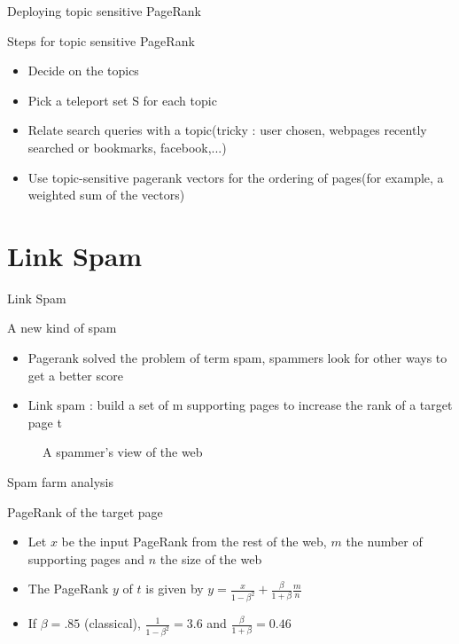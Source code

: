 \documentclass[10pt]{beamer}
\begin{document}
\begin{frame}{Deploying topic sensitive PageRank}
  \begin{block}{Steps for topic sensitive PageRank}
    \begin{itemize}
      \item Decide on the topics
      \item Pick a teleport set S for each topic
      \item Relate search queries with a topic(tricky : user chosen, webpages recently searched or bookmarks, facebook,...)
      \item Use topic-sensitive pagerank vectors for the ordering of pages(for example, a weighted sum of the vectors)
    \end{itemize}
  \end{block}
\end{frame}


\section{Link Spam}
\begin{frame}{Link Spam}
\begin{block}{A new kind of spam}
\begin{itemize}
\item Pagerank solved the problem of term spam, spammers look for other ways to get a better score
\item Link spam : build a set of m supporting pages to increase the rank of a target page t
\end{itemize}
\end{block}
\begin{figure}
\centering
\caption{A spammer's view of the web}
\end{figure}
\end{frame}

\begin{frame}{Spam farm analysis}
\begin{block}{PageRank of the target page}
\begin{itemize}
\item Let $x$ be the input PageRank from the rest of the web, $m$ the number of supporting pages and $n$ the size of the web
\item The PageRank $y$ of $t$ is given by
$ y = \frac{x}{1-\beta^2}+ \frac{\beta}{1+\beta} \frac{m}{n}$
\item If $\beta=.85$ (classical), $\frac{1}{1-\beta^2} = 3.6$ and $\frac{\beta}{1+\beta} = 0.46$
\end{itemize}
\end{block}
\end{frame}
\end{document}
